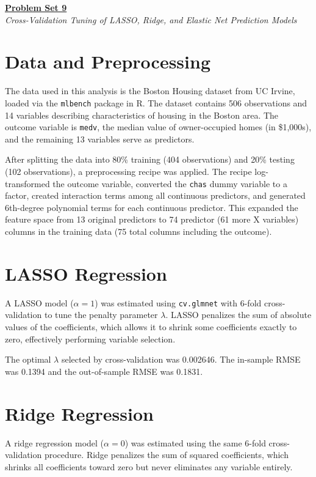\documentclass[12pt]{article}
\begin{document}
\begin{center}
\textbf{\underline{Problem Set 9}} \\
\vspace{4pt}
\textit{Cross-Validation Tuning of LASSO, Ridge, and Elastic Net Prediction Models}
\end{center}

\section*{Data and Preprocessing}

The data used in this analysis is the Boston Housing dataset from UC Irvine, loaded via the \texttt{mlbench} package in R. The dataset contains 506 observations and 14 variables describing characteristics of housing in the Boston area. The outcome variable is \texttt{medv}, the median value of owner-occupied homes (in \$1,000s), and the remaining 13 variables serve as predictors.

After splitting the data into 80\% training (404 observations) and 20\% testing (102 observations), a preprocessing recipe was applied. The recipe log-transformed the outcome variable, converted the \texttt{chas} dummy variable to a factor, created interaction terms among all continuous predictors, and generated 6th-degree polynomial terms for each continuous predictor. This expanded the feature space from 13 original predictors to 74 predictor (61 more X variables) columns in the training data (75 total columns including the outcome).

\section*{LASSO Regression}

A LASSO model ($\alpha = 1$) was estimated using \texttt{cv.glmnet} with 6-fold cross-validation to tune the penalty parameter $\lambda$. LASSO penalizes the sum of absolute values of the coefficients, which allows it to shrink some coefficients exactly to zero, effectively performing variable selection.

The optimal $\lambda$ selected by cross-validation was 0.002646. The in-sample RMSE was 0.1394 and the out-of-sample RMSE was 0.1831.

\section*{Ridge Regression}

A ridge regression model ($\alpha = 0$) was estimated using the same 6-fold cross-validation procedure. Ridge penalizes the sum of squared coefficients, which shrinks all coefficients toward zero but never eliminates any variable entirely.
\end{document}
